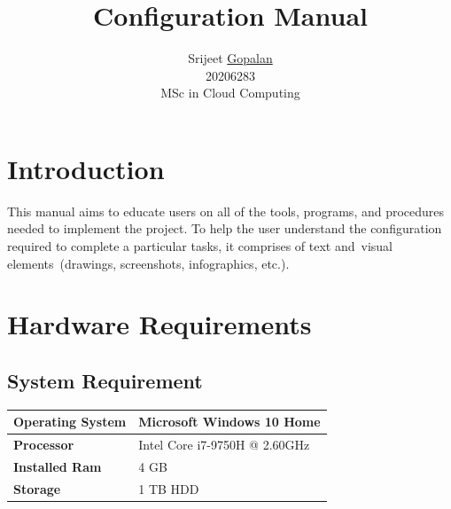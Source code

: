 \documentclass[10pt]{article}
\begin{document}
\title{Configuration Manual}%

\author{Srijeet \underline{Gopalan} \\ 20206283 \\ MSc in Cloud Computing}%

\maketitle





\tableofcontents
\thispagestyle{empty}
\cleardoublepage
\setcounter{page}{1}





\section{Introduction} 
This manual aims to educate users on all of the tools, programs, and procedures needed to implement the project. To help the user understand the configuration required to complete a particular tasks, it comprises of text and visual elements (drawings, screenshots, infographics, etc.).

\section{Hardware Requirements}
\subsection{System Requirement}

\begin{table}[H]
\begin{tabular}{|l|l|}
\hline
\textbf{Operating System} & Microsoft Windows 10 Home \\ \hline
\textbf{Processor} & Intel Core i7-9750H @ 2.60GHz \\ \hline
\textbf{Installed Ram} & 4 GB \\ \hline
\textbf{Storage} & 1 TB HDD \\ \hline
\end{tabular}
\end{table}
\end{document}
